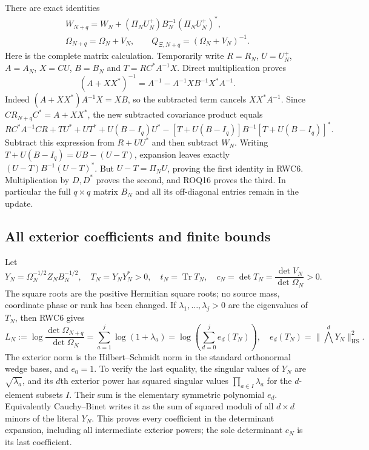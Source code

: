 \documentclass[11pt,a4paper]{article}
\begin{document}
There are exact identities
\begin{equation}\tag{RWC6}
\begin{gathered}
W_{N+q}=W_N+(\Pi_NU_N^+)B_N^{-1}(\Pi_NU_N^+)^*,\\
\Omega_{N+q}=\Omega_N+V_N,\qquad
Q_{\Xi,N+q}=(\Omega_N+V_N)^{-1}.
\end{gathered}
\end{equation}
Here is the complete matrix calculation. Temporarily write
$R=R_N$, $U=U_N^+$, $A=A_N$, $X=CU$, $B=B_N$ and
$T=RC^*A^{-1}X$. Direct multiplication proves
\[
(A+XX^*)^{-1}
 =A^{-1}-A^{-1}XB^{-1}X^*A^{-1}.
\]
Indeed $(A+XX^*)A^{-1}X=XB$, so the subtracted term cancels
$XX^*A^{-1}$. Since $CR_{N+q}C^*=A+XX^*$, the new subtracted
covariance product equals
\[
RC^*A^{-1}CR+TU^*+UT^*+U(B-I_q)U^*
 -[T+U(B-I_q)]B^{-1}[T+U(B-I_q)]^*.
\]
Subtract this expression from $R+UU^*$ and then subtract $W_N$.
Writing $T+U(B-I_q)=UB-(U-T)$, expansion leaves exactly
$(U-T)B^{-1}(U-T)^*$. But $U-T=\Pi_NU$, proving the first
identity in RWC6. Multiplication by $D,D^*$ proves the second,
and ROQ16 proves the third. In particular the full $q\times q$
matrix $B_N$ and all its off-diagonal entries remain in the update.

\subsection{All exterior coefficients and finite bounds}
Let
\begin{equation}\tag{RWC7}
Y_N=\Omega_N^{-1/2}Z_NB_N^{-1/2},\quad
T_N=Y_NY_N^*>0,\quad
t_N=\operatorname{Tr}T_N,\quad
c_N=\det T_N=\frac{\det V_N}{\det\Omega_N}>0.
\end{equation}
The square roots are the positive Hermitian square roots; no
source mass, coordinate phase or rank has been changed.
If $\lambda_1,\ldots,\lambda_j>0$ are the eigenvalues of $T_N$,
then RWC6 gives
\begin{equation}\tag{RWC8}
L_N:=\log\frac{\det\Omega_{N+q}}{\det\Omega_N}
 =\sum_{a=1}^j\log(1+\lambda_a)
 =\log\left(\sum_{d=0}^j e_d(T_N)\right),
\quad
e_d(T_N)=\|\bigwedge^d Y_N\|_{\mathrm{HS}}^2.
\end{equation}
The exterior norm is the Hilbert--Schmidt norm in the standard
orthonormal wedge bases, and $e_0=1$. To verify the last equality,
the singular values of $Y_N$ are $\sqrt{\lambda_a}$, and its
$d$th exterior power has squared singular values
$\prod_{a\in I}\lambda_a$ for the $d$-element subsets $I$.
Their sum is the elementary symmetric polynomial $e_d$.
Equivalently Cauchy--Binet writes it as the sum of squared moduli
of all $d\times d$ minors of the literal $Y_N$. This proves
every coefficient in the determinant expansion, including all
intermediate exterior powers; the sole determinant $c_N$ is its
last coefficient.
\end{document}
